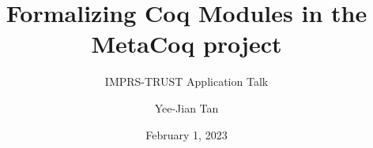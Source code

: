 
\title[Formalizing Coq Modules in the MetaCoq project]{Formalizing Coq Modules in the MetaCoq project}
\subtitle{IMPRS-TRUST Application Talk}
\author[YJ Tan]{Yee-Jian Tan}
\date{February 1, 2023}





	
	
	
	
	
	
	

